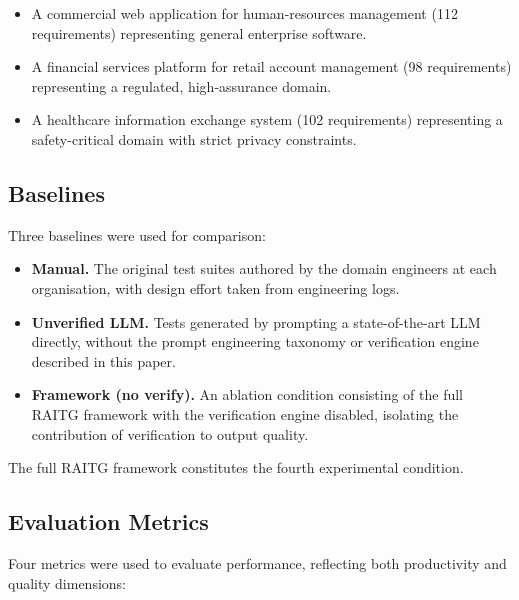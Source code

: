 \documentclass[11pt,letterpaper]{article}
\begin{document}
\begin{itemize}
\item A commercial web application for human-resources management (112 requirements) representing general enterprise software.
\item A financial services platform for retail account management (98 requirements) representing a regulated, high-assurance domain.
\item A healthcare information exchange system (102 requirements) representing a safety-critical domain with strict privacy constraints.
\end{itemize}

\begin{table}[!t]
\centering
\caption{Dataset summary by domain}
\label{tab:dataset_summary}


\end{table}

\subsection{Baselines}

Three baselines were used for comparison:

\begin{itemize}
\item \textbf{Manual.} The original test suites authored by the domain engineers at each organisation, with design effort taken from engineering logs.
\item \textbf{Unverified LLM.} Tests generated by prompting a state-of-the-art LLM directly, without the prompt engineering taxonomy or verification engine described in this paper.
\item \textbf{Framework (no verify).} An ablation condition consisting of the full RAITG framework with the verification engine disabled, isolating the contribution of verification to output quality.
\end{itemize}

The full RAITG framework constitutes the fourth experimental condition.

\subsection{Evaluation Metrics}

Four metrics were used to evaluate performance, reflecting both productivity and quality dimensions:
\end{document}
